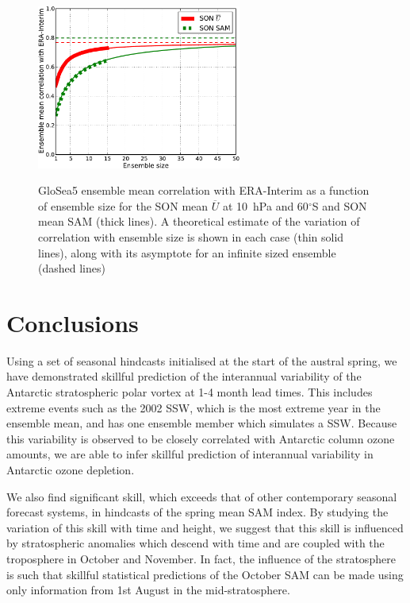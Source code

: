 \begin{figure}[t]
  \centering
  \noindent\includegraphics[width=0.6\textwidth,angle=0]{figures/chapter-seasonal/corr_ens_size_crop.pdf}\\
  \caption[Variation of GloSea5 forecast skill with ensemble size]{GloSea5
ensemble mean correlation with ERA-Interim as a function of ensemble size for
the SON mean $\overline{U}$ at 10~hPa and 60$^{\circ}$S and SON mean SAM (thick
lines). A theoretical estimate of the variation of correlation with ensemble
size is shown in each case (thin solid lines), along with its asymptote for an
infinite sized ensemble (dashed lines)}\label{fig:corr_ens_size_sh}
\end{figure}


\section{Conclusions}

Using a set of seasonal hindcasts initialised at the start of the austral
spring, we have demonstrated skillful prediction of the interannual variability
of the Antarctic stratospheric polar vortex at 1-4 month lead times. This
includes extreme events such as the 2002 SSW, which is the most extreme year in
the ensemble mean, and has one ensemble member which simulates a SSW. Because
this variability is observed to be closely correlated with Antarctic column
ozone amounts, we are able to infer skillful prediction of interannual
variability in Antarctic ozone depletion.

We also find significant skill, which exceeds that of other contemporary
seasonal forecast systems, in hindcasts of the spring mean SAM index.  By
studying the variation of this skill with time and height, we suggest that this
skill is influenced by stratospheric anomalies which descend with time and are
coupled with the troposphere in October and November. In fact, the influence of
the stratosphere is such that skillful statistical predictions of the October
SAM can be made using only information from 1st August in the mid-stratosphere.

